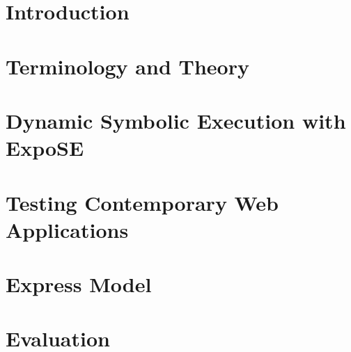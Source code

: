\documentclass[thesis]{plai}
\begin{document}
\vspace{1,5cm}







\newpage
\tableofcontents
{}
\listoffigures{}
\listoftables{}
\lstlistoflistings
{}
\pagestyle{fancy}
\fancyhf{}
\fancyhead[LO]{\leftmark}
\fancyhead[RO, LE]{\thepage}
\fancyhead[RE]{\rightmark}
\renewcommand{\headrulewidth}{0pt}



\chapter{Introduction}
\label{chapter:introduction}


\chapter{Terminology and Theory}
\label{chapter:background}


\chapter{Dynamic Symbolic Execution with ExpoSE}
\label{chapter:techstack}


\chapter{Testing Contemporary Web Applications}
\label{chapter:implementation}


\chapter{Express Model}
\label{chapter:express}


\chapter{Evaluation}
\label{chapter:evaluation}

\end{document}

